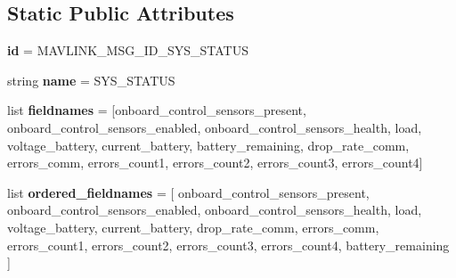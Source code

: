 \subsection*{Static Public Attributes}
\begin{DoxyCompactItemize}
\item 
\mbox{\label{classpymavlink_1_1dialects_1_1v10_1_1MAVLink__sys__status__message_af633214867bba57850c2b1973bb6c52a}} 
{\bfseries id} = M\+A\+V\+L\+I\+N\+K\+\_\+\+M\+S\+G\+\_\+\+I\+D\+\_\+\+S\+Y\+S\+\_\+\+S\+T\+A\+T\+US
\item 
\mbox{\label{classpymavlink_1_1dialects_1_1v10_1_1MAVLink__sys__status__message_adf1d0fa7b3e3eebd11739d3b50b3cac2}} 
string {\bfseries name} = \textquotesingle{}S\+Y\+S\+\_\+\+S\+T\+A\+T\+US\textquotesingle{}
\item 
\mbox{\label{classpymavlink_1_1dialects_1_1v10_1_1MAVLink__sys__status__message_a5c39305e3f3d7b5ecf20d2ef1836236f}} 
list {\bfseries fieldnames} = \mbox{[}\textquotesingle{}onboard\+\_\+control\+\_\+sensors\+\_\+present\textquotesingle{}, \textquotesingle{}onboard\+\_\+control\+\_\+sensors\+\_\+enabled\textquotesingle{}, \textquotesingle{}onboard\+\_\+control\+\_\+sensors\+\_\+health\textquotesingle{}, \textquotesingle{}load\textquotesingle{}, \textquotesingle{}voltage\+\_\+battery\textquotesingle{}, \textquotesingle{}current\+\_\+battery\textquotesingle{}, \textquotesingle{}battery\+\_\+remaining\textquotesingle{}, \textquotesingle{}drop\+\_\+rate\+\_\+comm\textquotesingle{}, \textquotesingle{}errors\+\_\+comm\textquotesingle{}, \textquotesingle{}errors\+\_\+count1\textquotesingle{}, \textquotesingle{}errors\+\_\+count2\textquotesingle{}, \textquotesingle{}errors\+\_\+count3\textquotesingle{}, \textquotesingle{}errors\+\_\+count4\textquotesingle{}\mbox{]}
\item 
\mbox{\label{classpymavlink_1_1dialects_1_1v10_1_1MAVLink__sys__status__message_a4ca8b0aceefd39b9d709efd0d556d132}} 
list {\bfseries ordered\+\_\+fieldnames} = \mbox{[} \textquotesingle{}onboard\+\_\+control\+\_\+sensors\+\_\+present\textquotesingle{}, \textquotesingle{}onboard\+\_\+control\+\_\+sensors\+\_\+enabled\textquotesingle{}, \textquotesingle{}onboard\+\_\+control\+\_\+sensors\+\_\+health\textquotesingle{}, \textquotesingle{}load\textquotesingle{}, \textquotesingle{}voltage\+\_\+battery\textquotesingle{}, \textquotesingle{}current\+\_\+battery\textquotesingle{}, \textquotesingle{}drop\+\_\+rate\+\_\+comm\textquotesingle{}, \textquotesingle{}errors\+\_\+comm\textquotesingle{}, \textquotesingle{}errors\+\_\+count1\textquotesingle{}, \textquotesingle{}errors\+\_\+count2\textquotesingle{}, \textquotesingle{}errors\+\_\+count3\textquotesingle{}, \textquotesingle{}errors\+\_\+count4\textquotesingle{}, \textquotesingle{}battery\+\_\+remaining\textquotesingle{} \mbox{]}

\end{DoxyCompactItemize}
